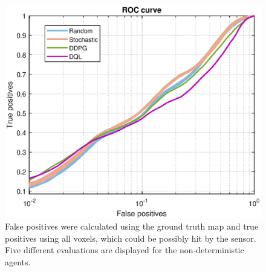 \begin{figure}[h!]
\centering
\includegraphics[width=1\linewidth]{fig/roc.eps}
\caption[ROC curves comparison]{False positives were calculated using the ground truth map and true positives using all voxels, which could be possibly hit by the sensor. Five different evaluations are displayed for the non-deterministic agents.}
\label{fig:roc}
\end{figure}

\clearpage


